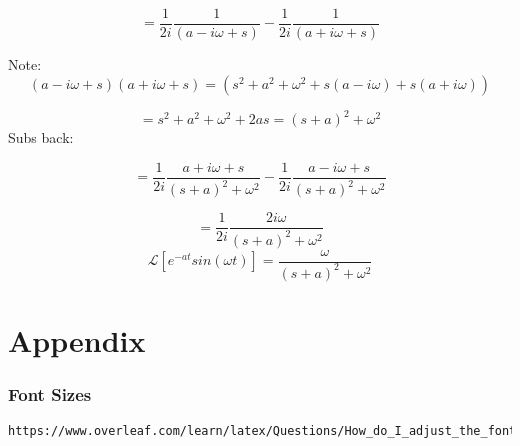 \documentclass[17pt]{extarticle}
\begin{document}
$$ = \frac{1}{2i}  \frac{1}{(a- i \omega+s)} -\frac{1}{2i}  \frac{1}{(a+ i \omega+s)} $$

Note:
$$(a- i\omega +s)(a +i \omega +s) = (s^2 +a^2 + \omega^2 +s(a-i \omega) +s (a + i \omega) ) $$

$$= s^2 + a^2 + \omega^2 + 2as = (s+a)^2 + \omega^2$$
Subs back:


$$ = \frac{1}{2i}  \frac{a+i \omega + s}{(s+a)^2 + \omega^2} -\frac{1}{2i}  \frac{a- i \omega + s}{(s+a)^2 + \omega^2} $$

$$ = \frac{1}{2i}  \frac{2 i \omega}{(s+a)^2 + \omega^2} $$
$$ \mathcal{L} \left[ e^{-a t}  sin (\omega t) \right] =  \frac{ \omega}{(s+a)^2 + \omega^2} $$



\part{Appendix}

\section{Font Sizes}

\begin{verbatim}
https://www.overleaf.com/learn/latex/Questions/How_do_I_adjust_the_font_size%3F
\end{verbatim}
\end{document}
